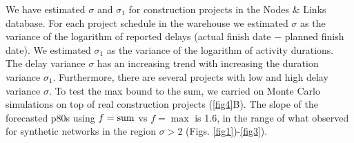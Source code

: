 \documentclass[reprint,aps,prl,amsmath,amssymb,superscriptaddress,showpacs]{revtex4-1}
\begin{document}
We have estimated $\sigma$ and $\sigma_1$ for construction projects in the Nodes \& Links database. For each project schedule in the warehouse we estimated $\sigma$ as the variance of the logarithm of reported delays (actual finish date $-$ planned finish date). We estimated $\sigma_1$ as the variance of the logarithm of activity durations. The delay variance $\sigma$ has an increasing trend with increasing the duration variance $\sigma_1$. Furthermore, there are several projects with low and high delay variance $\sigma$. To test the max bound to the sum, we carried on Monte Carlo simulations on top of real construction projects (\ref{fig4}B). The slope of the forecasted p80s using $f={\rm sum}$ vs $f=\max$ is 1.6, in the range of what observed for synthetic networks in the region $\sigma>2$ (Figs. \ref{fig1})-\ref{fig3}).
\end{document}
